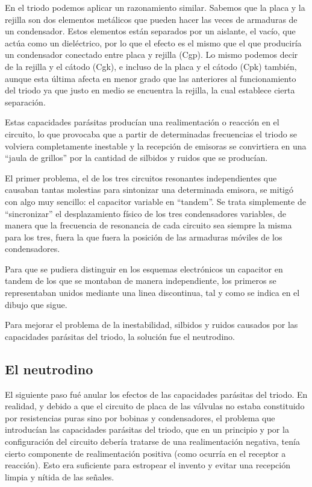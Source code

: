 \documentclass[letterpaper,10pt,spanish]{sphinxmanual}
\let\sphinxpxdimen\pdfpxdimen\else\newdimen\sphinxpxdimen
\begin{document}
En el triodo podemos aplicar un razonamiento similar. Sabemos que la placa y la rejilla son dos elementos metálicos que pueden hacer las veces de armaduras de un condensador. Estos elementos están separados por un aislante, el vacío, que actúa como un dieléctrico, por lo que el efecto es el mismo que el que produciría un condensador conectado entre placa y rejilla (Cgp). Lo mismo podemos decir de la rejilla y el cátodo (Cgk), e incluso de la placa y el cátodo (Cpk) también, aunque esta última
afecta en menor grado que las anteriores al funcionamiento del triodo ya que justo en medio se encuentra la rejilla, la cual establece cierta separación.

Estas capacidades parásitas producían una realimentación o reacción en el circuito, lo que provocaba que a partir de determinadas frecuencias el triodo se volviera completamente inestable y la recepción de emisoras se convirtiera en una “jaula de grillos” por la cantidad de silbidos y ruidos que se producían.

El primer problema, el de los tres circuitos resonantes independientes que causaban tantas molestias para sintonizar una determinada emisora, se mitigó con algo muy sencillo: el capacitor variable en “tandem”. Se trata simplemente de “sincronizar” el desplazamiento físico de los tres condensadores variables, de manera que la frecuencia de resonancia de cada circuito sea siempre la misma para los tres, fuera la que fuera la posición de las armaduras móviles de los condensadores.

Para que se pudiera distinguir en los esquemas electrónicos un capacitor en tandem de los que se montaban de manera independiente, los primeros se representaban unidos mediante una linea discontinua, tal y como se indica en el dibujo que sigue.

\sphinxincludegraphics[width=588\sphinxpxdimen,height=213\sphinxpxdimen]{{receprfs2low}.png}

Para mejorar el problema de la inestabilidad, silbidos y ruidos causados por las capacidades parásitas del triodo, la solución fue el neutrodino.


\subsection{El neutrodino}
\label{\detokenize{introduccion/sistemas:El-neutrodino}}
El siguiente paso fué anular los efectos de las capacidades parásitas del triodo. En realidad, y debido a que el circuito de placa de las válvulas no estaba constituido por resistencias puras sino por bobinas y condensadores, el problema que introducían las capacidades parásitas del triodo, que en un principio y por la configuración del circuito debería tratarse de una realimentación negativa, tenía cierto componente de realimentación positiva (como ocurría en el receptor a reacción). Esto era
suficiente para estropear el invento y evitar una recepción limpia y nítida de las señales.
\end{document}
